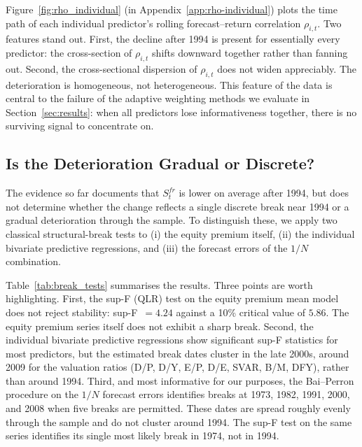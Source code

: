 \documentclass[a4paper,11pt]{article}
\begin{document}
Figure~\ref{fig:rho_individual} (in Appendix~\ref{app:rho-individual})
plots the time path of each individual predictor's rolling forecast--return
correlation $\rho_{i,t}$. Two features stand out. First, the decline after
1994 is present for essentially every predictor: the cross-section of
$\rho_{i,t}$ shifts downward together rather than fanning out. Second,
the cross-sectional dispersion of $\rho_{i,t}$ does not widen
appreciably. The deterioration is homogeneous, not heterogeneous. This
feature of the data is central to the failure of the adaptive weighting
methods we evaluate in Section~\ref{sec:results}: when all predictors
lose informativeness together, there is no surviving signal to
concentrate on.

\subsection{Is the Deterioration Gradual or Discrete?}\label{subsec:breaks}

The evidence so far documents that $S^{fr}_t$ is lower on average after
1994, but does not determine whether the change reflects a single discrete
break near 1994 or a gradual deterioration through the sample. To
distinguish these, we apply two classical structural-break tests to (i)
the equity premium itself, (ii) the individual bivariate predictive
regressions, and (iii) the forecast errors of the $1/N$ combination.

Table~\ref{tab:break_tests} summarises the results. Three points are
worth highlighting. First, the sup-F (QLR) test on the equity premium
mean model does not reject stability: sup-F~$=4.24$ against a 10\%
critical value of $5.86$. The equity premium series itself does not
exhibit a sharp break. Second, the individual bivariate predictive
regressions show significant sup-F statistics for most predictors, but
the estimated break dates cluster in the late 2000s, around 2009 for
the valuation ratios (D/P, D/Y, E/P, D/E, SVAR, B/M, DFY), rather than
around 1994. Third, and most informative for our purposes, the
Bai--Perron procedure on the $1/N$ forecast errors identifies breaks at
1973, 1982, 1991, 2000, and 2008 when five breaks are permitted. These
dates are spread roughly evenly through the sample and do not cluster
around 1994. The sup-F test on the same series identifies its single
most likely break in 1974, not in 1994.
\end{document}
